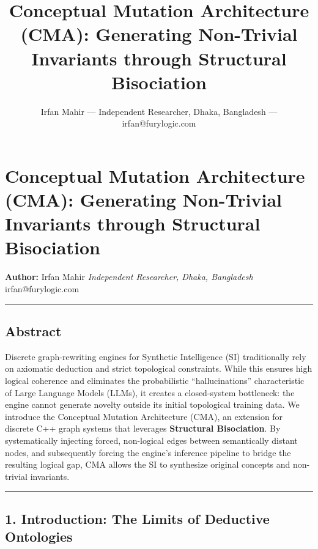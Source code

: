 \documentclass[
  11pt,
  a4paper,
]{article}
\title{Conceptual Mutation Architecture (CMA): Generating Non-Trivial
Invariants through Structural Bisociation}
\author{Irfan Mahir --- Independent Researcher, Dhaka, Bangladesh ---
irfan@furylogic.com}
\date{}
\begin{document}
\maketitle

{
\hypersetup{linkcolor=}
\setcounter{tocdepth}{3}
\tableofcontents
}
\section{Conceptual Mutation Architecture (CMA): Generating Non-Trivial
Invariants through Structural
Bisociation}\label{conceptual-mutation-architecture-cma-generating-non-trivial-invariants-through-structural-bisociation}

\textbf{Author:} Irfan Mahir \emph{Independent Researcher, Dhaka,
Bangladesh} irfan@furylogic.com

\begin{center}\rule{0.5\linewidth}{0.5pt}\end{center}

\subsection{Abstract}\label{abstract}

Discrete graph-rewriting engines for Synthetic Intelligence (SI)
traditionally rely on axiomatic deduction and strict topological
constraints. While this ensures high logical coherence and eliminates
the probabilistic ``hallucinations'' characteristic of Large Language
Models (LLMs), it creates a closed-system bottleneck: the engine cannot
generate novelty outside its initial topological training data. We
introduce the Conceptual Mutation Architecture (CMA), an extension for
discrete C++ graph systems that leverages \textbf{Structural
Bisociation}. By systematically injecting forced, non-logical edges
between semantically distant nodes, and subsequently forcing the
engine's inference pipeline to bridge the resulting logical gap, CMA
allows the SI to synthesize original concepts and non-trivial
invariants.

\begin{center}\rule{0.5\linewidth}{0.5pt}\end{center}

\subsection{1. Introduction: The Limits of Deductive
Ontologies}\label{introduction-the-limits-of-deductive-ontologies}
\end{document}
